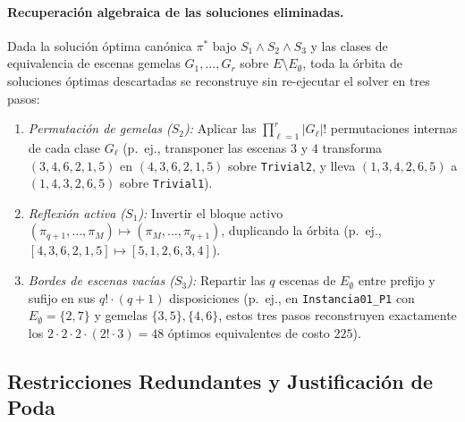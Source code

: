 \paragraph{Recuperación algebraica de las soluciones eliminadas.}
Dada la solución óptima canónica $\pi^*$ bajo $S_1 \land S_2 \land S_3$ y las clases de equivalencia de escenas gemelas $G_1, \dots, G_r$ sobre $E \setminus E_{\emptyset}$, toda la órbita de soluciones óptimas descartadas se reconstruye sin re-ejecutar el solver en tres pasos:
\begin{enumerate}
    \item \emph{Permutación de gemelas ($S_2$):} Aplicar las $\prod_{\ell=1}^r |G_\ell|!$ permutaciones internas de cada clase $G_\ell$ (p.\ ej., transponer las escenas $3$ y $4$ transforma $(3, 4, 6, 2, 1, 5)$ en $(4, 3, 6, 2, 1, 5)$ sobre \texttt{Trivial2}, y lleva $(1, 3, 4, 2, 6, 5)$ a $(1, 4, 3, 2, 6, 5)$ sobre \texttt{Trivial1}).
    \item \emph{Reflexión activa ($S_1$):} Invertir el bloque activo $(\pi_{q+1}, \dots, \pi_M) \mapsto (\pi_M, \dots, \pi_{q+1})$, duplicando la órbita (p.\ ej., $[4, 3, 6, 2, 1, 5] \mapsto [5, 1, 2, 6, 3, 4]$).
    \item \emph{Bordes de escenas vacías ($S_3$):} Repartir las $q$ escenas de $E_{\emptyset}$ entre prefijo y sufijo en sus $q! \cdot (q + 1)$ disposiciones (p.\ ej., en \texttt{Instancia01\_P1} con $E_{\emptyset}=\{2,7\}$ y gemelas $\{3,5\}, \{4,6\}$, estos tres pasos reconstruyen exactamente los $2 \cdot 2 \cdot 2 \cdot (2! \cdot 3) = 48$ óptimos equivalentes de costo $225$).
\end{enumerate}

\subsection{Restricciones Redundantes y Justificación de Poda}
\label{subsec:redundantes}


